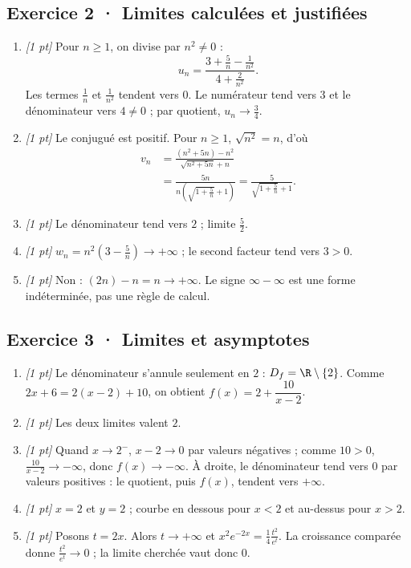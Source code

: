 \subsection*{Exercice 2 · Limites calculées et justifiées}\begin{enumerate}

\item \textit{[1 pt]} Pour $n\ge1$, on divise par $n^2\ne0$ :
\[u_n=\frac{3+\frac{5}{n}-\frac{1}{n^2}}{4+\frac{2}{n^2}}.\]
Les termes $\frac{1}{n}$ et $\frac{1}{n^2}$ tendent vers $0$. Le numérateur tend vers $3$ et le dénominateur vers $4\ne0$ ; par quotient, $u_n\to\frac{3}{4}$.

\item \textit{[1 pt]} Le conjugué est positif. Pour $n\ge1$, $\sqrt{n^2}=n$, d'où
\[\begin{aligned}v_n&=\frac{(n^2+5n)-n^2}{\sqrt{n^2+5n}+n}\\&=\frac{5n}{n(\sqrt{1+\frac{5}{n}}+1)}=\frac{5}{\sqrt{1+\frac{5}{n}}+1}.\end{aligned}\]

\item \textit{[1 pt]} Le dénominateur tend vers $2$ ; limite $\frac{5}{2}$.

\item \textit{[1 pt]} $w_n=n^2(3-\frac{5}{n})\to+\infty$ ; le second facteur tend vers $3>0$.

\item \textit{[1 pt]} Non : $(2n)-n=n\to+\infty$. Le signe $\infty-\infty$ est une forme indéterminée, pas une règle de calcul.

\end{enumerate}

\subsection*{Exercice 3 · Limites et asymptotes}\begin{enumerate}

\item \textit{[1 pt]} Le dénominateur s'annule seulement en $2$ : $D_f=\R\setminus\{2\}$. Comme $2x+6=2(x-2)+10$, on obtient $f(x)=2+\dfrac{10}{x-2}$.

\item \textit{[1 pt]} Les deux limites valent $2$.

\item \textit{[1 pt]} Quand $x\to 2^-$, $x-2\to0$ par valeurs négatives ; comme $10>0$, $\frac{10}{x-2}\to-\infty$, donc $f(x)\to-\infty$. À droite, le dénominateur tend vers $0$ par valeurs positives : le quotient, puis $f(x)$, tendent vers $+\infty$.

\item \textit{[1 pt]} $x=2$ et $y=2$ ; courbe en dessous pour $x<2$ et au-dessus pour $x>2$.

\item \textit{[1 pt]} Posons $t=2x$. Alors $t\to+\infty$ et $x^2e^{-2x}=\frac{1}{4}\frac{t^2}{e^t}$. La croissance comparée donne $\frac{t^2}{e^t}\to0$ ; la limite cherchée vaut donc $0$.

\end{enumerate}

